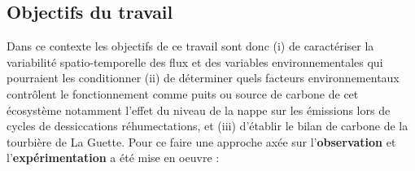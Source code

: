 

\subsection*{Objectifs du travail}
Dans ce contexte les objectifs de ce travail sont donc (i) de caractériser la variabilité spatio-temporelle des flux et des variables environnementales qui pourraient les conditionner (ii) de déterminer quels facteurs environnementaux contrôlent le fonctionnement comme puits ou source de carbone de cet écosystème notamment l'effet du niveau de la nappe sur les émissions lors de cycles de dessiccations réhumectations, et (iii) d'établir le bilan de carbone de la tourbière de La Guette.
Pour ce faire une approche axée sur l'\textbf{observation} et l'\textbf{expérimentation} a été mise en oeuvre : 


